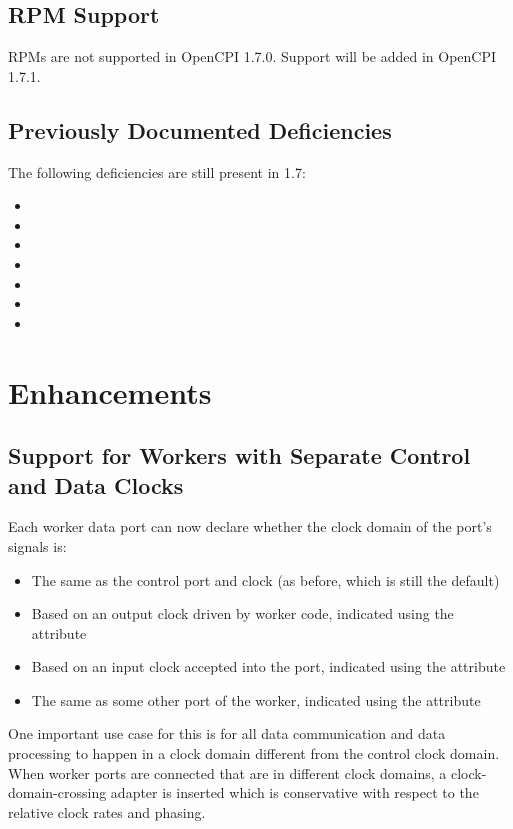 \subsection{RPM Support}
\label{bug:17_rpms}
RPMs are not supported in OpenCPI 1.7.0. Support will be added in OpenCPI 1.7.1.

\subsection{Previously Documented Deficiencies}
The following deficiencies are still present in 1.7:
\begin{itemize}
\setlength\itemsep{0em} %
\item {}
\item {}
\item {}
\item {}
\item {}
\item {}
\item {}
\end{itemize}


\beginoldnotes
{}
\def\ocpiversion{v1.6.2}  %
\section{Enhancements}
\subsection{Support for Workers with Separate Control and Data Clocks} %
\label{sec:16_clocks}
Each worker data port can now declare whether the clock domain of the port's signals is:
\begin{itemize}
\setlength\itemsep{0em} %
\item The same as the control port and clock (as before, which is still the default)
\item Based on an output clock driven by worker code, indicated using the  attribute
\item Based on an input clock accepted into the port, indicated using the  attribute
\item The same as some other port of the worker, indicated using the  attribute
\end{itemize}
One important use case for this is for all data communication and data processing to happen in a clock domain
different from the control clock domain.
When worker ports are connected that are in different clock domains, a clock-domain-crossing adapter is inserted which is conservative with respect to the relative clock rates and phasing.

